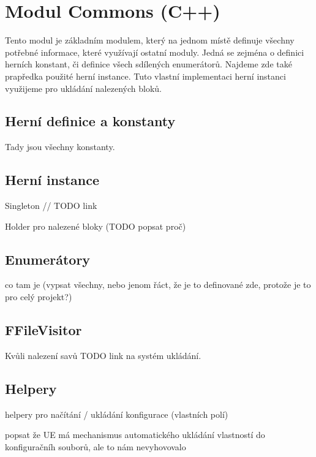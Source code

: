 
\section{Modul Commons (C++)}

Tento modul je základním modulem, který na jednom místě definuje všechny potřebné informace, které využívají ostatní moduly. Jedná se zejména o definici herních konstant, či definice všech sdílených enumerátorů. Najdeme zde také prapředka použité herní instance. Tuto vlastní implementaci herní instanci využijeme pro ukládání nalezených bloků.

\subsection{Herní definice a konstanty}


Tady jsou všechny konstanty.

\subsection{Herní instance}

Singleton // TODO link

Holder pro nalezené bloky (TODO popsat proč)

\subsection{Enumerátory}


co tam je (vypsat všechny, nebo jenom řáct, že je to definované zde, protože je to pro celý projekt?)

\subsection{FFileVisitor}

Kvůli nalezení savů
TODO link na systém ukládání.

\subsection{Helpery}

helpery pro načítání / ukládání konfigurace (vlastních polí)

popsat že UE má mechanismus automatického ukládání vlastností do konfiguračníh souborů, ale to nám nevyhovovalo